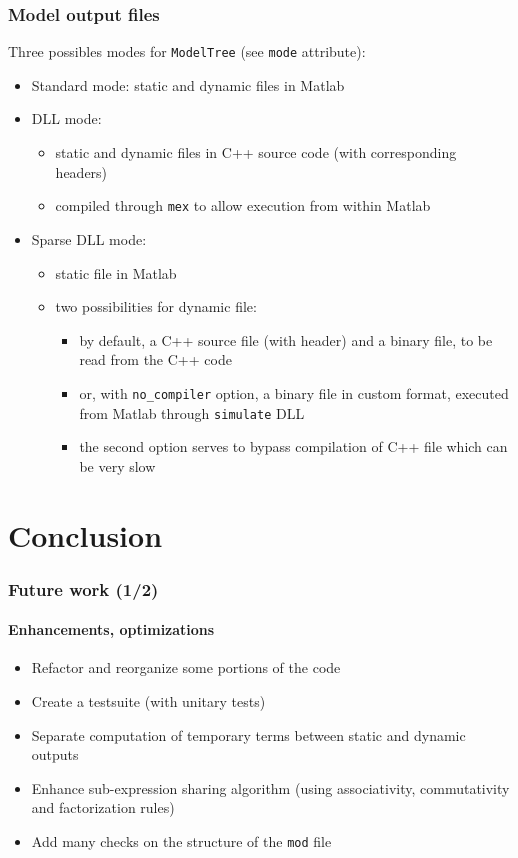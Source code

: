 \documentclass{beamer}
\begin{document}
\begin{frame}
  \frametitle{Model output files}
  Three possibles modes for \texttt{ModelTree} (see \texttt{mode} attribute):
  \begin{itemize}
  \item Standard mode: static and dynamic files in Matlab
  \item DLL mode:
    \begin{itemize}
    \item static and dynamic files in C++ source code (with corresponding headers)
    \item compiled through \texttt{mex} to allow execution from within Matlab
    \end{itemize}
  \item Sparse DLL mode:
    \begin{itemize}
    \item static file in Matlab
    \item two possibilities for dynamic file:
      \begin{itemize}
      \item by default, a C++ source file (with header) and a binary file, to be read from the C++ code
      \item or, with \texttt{no\_compiler} option, a binary file in custom format, executed from Matlab through \texttt{simulate} DLL
      \item the second option serves to bypass compilation of C++ file which can be very slow
      \end{itemize}
    \end{itemize}
  \end{itemize}
\end{frame}

\section{Conclusion}

\begin{frame}
  \frametitle{Future work (1/2)}
  \framesubtitle{Enhancements, optimizations}
  \begin{itemize}
  \item Refactor and reorganize some portions of the code
  \item Create a testsuite (with unitary tests)
  \item Separate computation of temporary terms between static and dynamic outputs
  \item Enhance sub-expression sharing algorithm (using associativity, commutativity and factorization rules)
  \item Add many checks on the structure of the \texttt{mod} file
  \end{itemize}
\end{frame}
\end{document}

